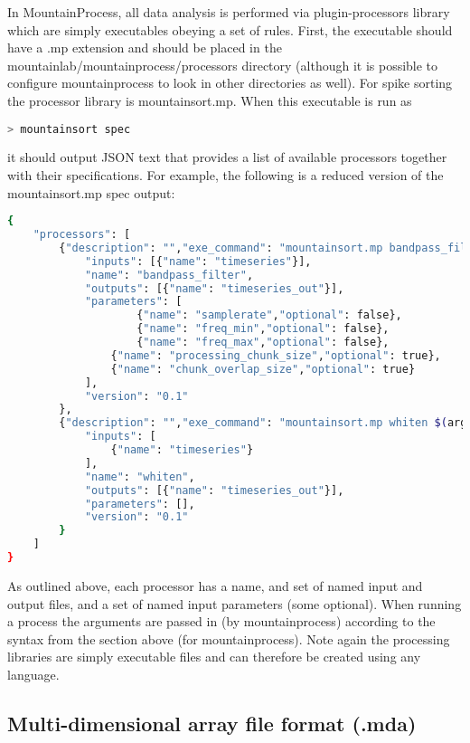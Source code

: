 \documentclass{article}
\begin{document}
In MountainProcess, all data analysis is performed via plugin-processors library which are simply executables obeying a set of rules. First, the executable should have a .mp extension and should be placed in the mountainlab/mountainprocess/processors directory (although it is possible to configure mountainprocess to look in other directories as well). For spike sorting the processor library is mountainsort.mp. When this executable is run as
\begin{lstlisting}[language=bash]
> mountainsort spec
\end{lstlisting}
it should output JSON text that provides a list of available processors together with their specifications. For example, the following is a reduced version of the mountainsort.mp spec output:
\begin{lstlisting}[language=bash]
{
    "processors": [
        {"description": "","exe_command": "mountainsort.mp bandpass_filter $(arguments)",
            "inputs": [{"name": "timeseries"}],
            "name": "bandpass_filter",
            "outputs": [{"name": "timeseries_out"}],
            "parameters": [
                    {"name": "samplerate","optional": false},
                    {"name": "freq_min","optional": false},
                    {"name": "freq_max","optional": false},
                {"name": "processing_chunk_size","optional": true},
                {"name": "chunk_overlap_size","optional": true}
            ],
            "version": "0.1"
        },
        {"description": "","exe_command": "mountainsort.mp whiten $(arguments)",
            "inputs": [
                {"name": "timeseries"}
            ],
            "name": "whiten",
            "outputs": [{"name": "timeseries_out"}],
            "parameters": [],
            "version": "0.1"
        }
    ]
}
\end{lstlisting}

As outlined above, each processor has a name, and set of named input and output files, and a set of named input parameters (some optional). When running a process the arguments are passed in (by mountainprocess) according to the syntax from the section above (for mountainprocess). Note again the processing libraries are simply executable files and can therefore be created using any language.

\subsection{Multi-dimensional array file format (.mda)}
\end{document}
